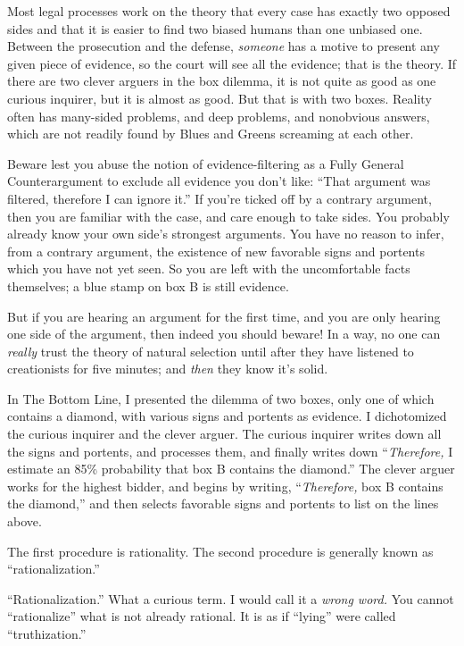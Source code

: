 {
 Most legal processes work on the theory that every case has
exactly two opposed sides and that it is easier to find two biased
humans than one unbiased one. Between the prosecution and the defense,
\textit{someone} has a motive to present any given piece of evidence,
so the court will see all the evidence; that is the theory. If there
are two clever arguers in the box dilemma, it is not quite as good as
one curious inquirer, but it is almost as good. But that is with two
boxes. Reality often has many-sided problems, and deep problems, and
nonobvious answers, which are not readily found by Blues and Greens
screaming at each other.}

{
 Beware lest you abuse the notion of evidence-filtering as a Fully
General Counterargument to exclude all evidence you
don't like: ``That argument was
filtered, therefore I can ignore it.'' If
you're ticked off by a contrary argument, then you are
familiar with the case, and care enough to take sides. You probably
already know your own side's strongest arguments. You
have no reason to infer, from a contrary argument, the existence of new
favorable signs and portents which you have not yet seen. So you are
left with the uncomfortable facts themselves; a blue stamp on box B is
still evidence.}

{
 But if you are hearing an argument for the first time, and you are
only hearing one side of the argument, then indeed you should beware!
In a way, no one can \textit{really} trust the theory of natural
selection until after they have listened to creationists for five
minutes; and \textit{then} they know it's solid.}

\myendsectiontext


{
 In The Bottom Line, I presented the dilemma of two boxes, only one
of which contains a diamond, with various signs and portents as
evidence. I dichotomized the curious inquirer and the clever arguer.
The curious inquirer writes down all the signs and portents, and
processes them, and finally writes down
``\textit{Therefore,} I estimate an 85\% probability
that box B contains the diamond.'' The clever arguer
works for the highest bidder, and begins by writing,
``\textit{Therefore,} box B contains the
diamond,'' and then selects favorable signs and
portents to list on the lines above. }

{
 The first procedure is rationality. The second procedure is
generally known as
``rationalization.''}

{
 ``Rationalization.'' What a
curious term. I would call it a \textit{wrong word.} You cannot
``rationalize'' what is not already
rational. It is as if ``lying'' were
called ``truthization.''}

